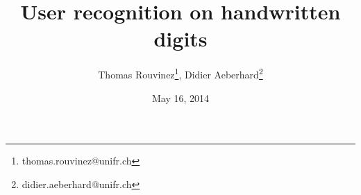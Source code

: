 \documentclass[a4paper]{article}
\begin{document}


\newenvironment{listCustom}{
 \begin{list}{{$\bullet$}}{		%
  \setlength{\partopsep}{0pt}
  \setlength{\parskip}{0pt}
  \setlength{\parsep}{0pt}
  \setlength{\topsep}{5mm}
  \setlength{\itemsep}{1mm}		%
  \setlength{\labelsep}{0.25cm} %
  \setlength{\leftmargin}{2cm}  %
 }
}{
 \end{list}
}

{\setlength{\leftmargini}{2cm} 
\newenvironment{listCustomNumber}{
 \begin{enumerate}{		%
  \setlength{\leftmargin}{2cm}  %
 }
}{
 \end{enumerate}
}

\newcommand*{\xml}[1]{\texttt{<#1>}}

\newcommand*{\webquote}[1]{\textsf{\og #1 \fg{}}}

\renewcommand{\contentsname}{Table of Content}
	

\title{User recognition on handwritten digits}

\author{Thomas Rouvinez\footnote{thomas.rouvinez@unifr.ch}, Didier Aeberhard\footnote{didier.aeberhard@unifr.ch}}
\date{May 16, 2014}


\rrno{}
\maketitle

\pagebreak


	
\tableofcontents

\pagebreak


}
\end{document}
